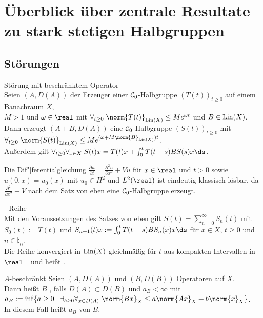 \section{%
    Überblick über zentrale Resultate zu stark stetigen Halbgruppen%
}

\subsection{%
    Störungen%
}

\begin{Satz}{Störung mit beschränktem Operator}\\
    Seien $(A, D(A))$ der Erzeuger einer $\mathcal{C}_0$-Halbgruppe $(T(t))_{t \ge 0}$ auf einem
    Banachraum $X$,\\
    $M > 1$ und $\omega \in \real$ mit
    $\forall_{t \ge 0}\; \norm{T(t)}_{\Lin(X)} \le Me^{\omega t}$ und $B \in \operatorname{Lin}(X)$.\\
    Dann erzeugt $(A + B, D(A))$ eine $\mathcal{C}_0$-Halbgruppe $(S(t))_{t \ge 0}$ mit\\
    $\forall_{t \ge 0}\; \norm{S(t)}_{\Lin(X)} \le Me^{(\omega + M\norm{B}_{\Lin(X)}) t}$.\\
    Außerdem gilt $\forall_{t \ge 0} \forall_{x \in X}\;
    S(t)x = T(t)x + \int_0^t T(t-s)BS(s)x\ds$.
\end{Satz}

\begin{Bsp}
    Die Dif"|ferentialgleichung
    $\frac{\partial u}{\partial t} = \frac{\partial^2 u}{\partial x^2} + Vu$
    für $x \in \real$ und $t > 0$ sowie $u(0, x) = u_0(x)$ mit $u_0 \in H^2$ und $L^2(\real)$
    ist eindeutig klassisch lösbar, da $\frac{\partial^2}{\partial x^2} + V$ nach dem Satz von
    eben eine $\mathcal{C}_0$-Halbgruppe erzeugt.
\end{Bsp}

\begin{Satz}{--Reihe}\\
    Mit den Voraussetzungen des Satzes von eben gilt
    $S(t) = \sum_{n=0}^\infty S_n(t)$ mit $S_0(t) := T(t)$ und
    $S_{n+1}(t)x := \int_0^t T(t-s)BS_n(x)x\ds$ für $x \in X$, $t \ge 0$ und $n \in \natural_0$.\\
    Die Reihe konvergiert in $\operatorname{Lin}(X)$ gleichmäßig für $t$ aus kompakten Intervallen in $\real^+$
    und heißt .
\end{Satz}

\linie

\begin{Def}{$A$-beschränkt}
    Seien $(A, D(A))$ und $(B, D(B))$ Operatoren auf $X$.\\
    Dann heißt $B$ , falls $D(A) \subset D(B)$ und $a_B < \infty$ mit\\
    $a_B := \inf\{a \ge 0 \;|\; \exists_{b \ge 0} \forall_{x \in D(A)}\;
    \norm{Bx}_X \le a \norm{Ax}_X + b \norm{x}_X\}$.\\
    In diesem Fall heißt $a_B$  von $B$.
\end{Def}

